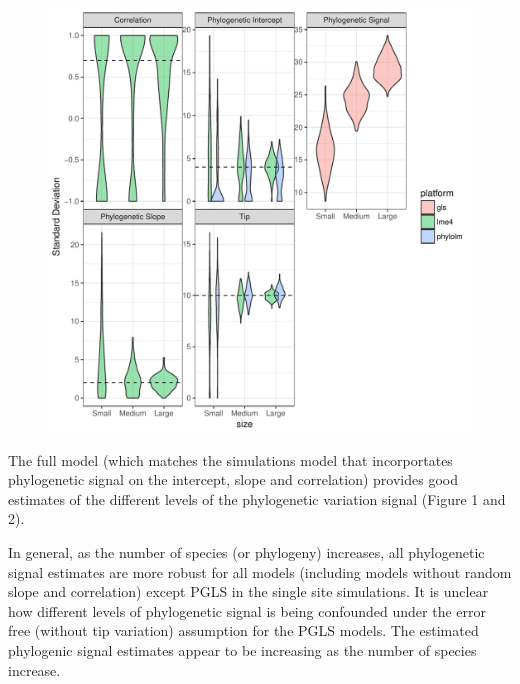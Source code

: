 \begin{center}
\begin{figure}[h]
\includegraphics[scale=0.8,page=1]{./git_push/ssplot.pdf}
\label{ssplot}
\end{figure}
\end{center}

The full model (which matches the simulations model that incorportates phylogenetic signal on the intercept, slope and correlation) provides good estimates of the different levels of the phylogenetic variation signal (Figure 1 and 2).

In general, as the number of species (or phylogeny) increases, all phylogenetic signal estimates are more robust for all models (including models without random slope and correlation) except PGLS in the single site simulations. 
It is unclear how different levels of phylogenetic signal is being confounded under the error free (without tip variation) assumption for the PGLS models.
The estimated phylogenic signal estimates appear to be increasing as the number of species increase.

